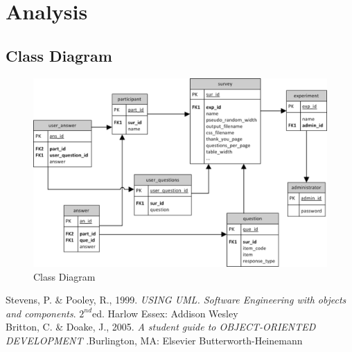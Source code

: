 \documentclass[a4paper,12pt,oneside]{report}
\begin{document}

\chapter{Analysis}
\section{Class Diagram}


\begin{figure}[h]
  \begin{center}
  \includegraphics[width=16.2cm]{pics/class.png}
  \end{center}
 \caption{Class Diagram}
\end{figure}


\pagebreak
\begin{thebibliography}{XXX}
 Stevens, P. \& Pooley, R., 1999. {\it USING UML. Software Engineering with objects and components}. $2^{nd}$ed. Harlow Essex: Addison Wesley \\
 Britton, C. \& Doake, J., 2005. {\it A student guide to OBJECT-ORIENTED DEVELOPMENT }.Burlington, MA: Elsevier Butterworth-Heinemann\\
\end{thebibliography}
\end{document}

